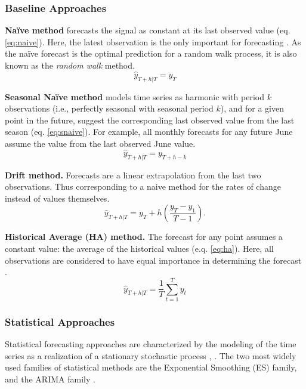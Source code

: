 \subsubsection{Baseline Approaches}\label{subsubsec:baseline_methods}

\noindent
\textbf{Naïve method} forecasts the signal as constant at its last observed value (eq. \ref{eq:naive}).
Here, the latest observation is the only important for forecasting \cite{hyndman2018principles}.
As the naïve forecast is the optimal prediction for a random walk process, it is also known as the \textit{random walk} method.
\begin{equation}\label{eq:naive}
    \hat{y}_{T+h|T} = y_T
\end{equation}

\noindent
\textbf{Seasonal Naïve method} models time series as harmonic with period $k$ observations (i.e., perfectly seasonal with seasonal period $k$), and for a given point in the future, suggest the corresponding last observed value from the last season (eq. \ref{eq:snaive}).
For example, all monthly forecasts for any future June assume the value from the last observed June value.
\begin{equation}\label{eq:snaive}
    \hat{y}_{T+h|T} = y_{T+h-k}
\end{equation}

\noindent
\textbf{Drift method.} Forecasts are a linear extrapolation from the last two observations.
Thus corresponding to a naive method for the rates of change instead of values themselves.
\begin{equation}\label{eq:drift}
    \hat{y}_{T+h|T} = y_{T} + h\left(\frac{y_T-y_1}{T-1} \right).
\end{equation}


\noindent
\textbf{Historical Average (HA) method.} The forecast for any point assumes a constant value: the average of the historical values (e.q. \ref{eq:ha}).
Here, all observations are considered to have equal importance in determining the forecast \cite{hyndman2018principles}.
\begin{equation}\label{eq:ha}
\hat{y}_{T+h|T} = \frac{1}{T}\sum_{t=1}^Ty_t
\end{equation}

\subsubsection{Statistical Approaches}\label{subsubsec:statistical_methods}

Statistical forecasting approaches are characterized by the modeling of the time series as a realization of a stationary stochastic process \cite{brockwell1990methods}, \cite{bontempi2013strategies}.
The two most widely used families of statistical methods are the Exponential Smoothing (ES) family, and the ARIMA family \cite{hyndman2018principles}.

